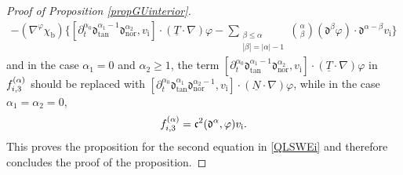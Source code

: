 \documentclass[11pt]{article}
\newcommand{\dtan}{{\mathfrak d}_\mathrm{tan}}
\newcommand{\dnor}{{\mathfrak d}_\mathrm{nor}}
\newcommand{\dt}{\partial_t}
\newcommand{\ul}[1]{\underline{#1}}
\theoremstyle{definition}
\begin{document}
\begin{proof}[Proof of Proposition \ref{propGUinterior}]
\begin{multline}
- (\nabla^\varphi\chi_\mathrm{b})\biggl\{ [\dt^{\alpha_0}\dtan^{\alpha_1-1}\dnor^{\alpha_2},v_\mathrm{i}]\cdot(\ul{T}\cdot\nabla)\varphi
- \sum_{\substack{\beta\leq\alpha\\ |\beta|=|\alpha|-1}} \binom{\alpha}{\beta}(\mathfrak{d}^{\beta}\varphi)\cdot\mathfrak{d}^{\alpha-\beta}v_\mathrm{i} \biggr\}
\end{multline}
and in the case $\alpha_1=0$ and $\alpha_2\geq1$, the term $[\dt^{\alpha_0}\dtan^{\alpha_1-1}\dnor^{\alpha_2},v_\mathrm{i}]\cdot(\ul{T}\cdot\nabla)\varphi$
in $f_{{\rm i},3}^{(\alpha)}$ should be replaced with $[\dt^{\alpha_0}\dtan^{\alpha_1}\dnor^{\alpha_2-1},v_\mathrm{i}]\cdot(\ul{N}\cdot\nabla)\varphi$,
while in the case $\alpha_1=\alpha_2=0$,
\begin{equation}\label{deffi3bis}
f_{{\rm i},3}^{(\alpha)} = \mathfrak{c}^2(\mathfrak{d}^\alpha,\varphi)v_\mathrm{i}.
\end{equation}
This proves the proposition for the second equation in \eqref{QLSWEi} and therefore concludes the proof of the proposition.
\end{proof}
\end{document}
